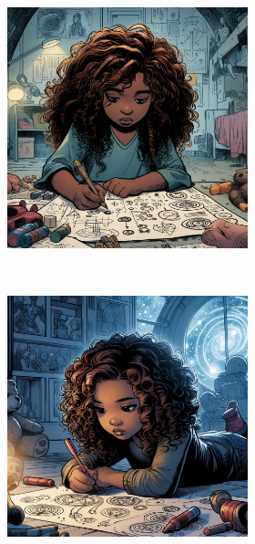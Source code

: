 \documentclass[a4paper,11pt]{article}
\begin{document}
\begin{figure}
\begin{subfigure}{0.4934\textwidth}
    \end{subfigure}
    \hfill 
    \begin{subfigure}{0.48\textwidth}
        \begin{subfigure}{1\textwidth}
            \includegraphics[width=\textwidth]{figures/bias.jpeg}
        \end{subfigure}\\
        \begin{subfigure}{1\textwidth}
            \includegraphics[width=\textwidth]{figures/bias2.jpeg}
        \end{subfigure}
    \end{subfigure}
            

\end{figure}
\end{document}
